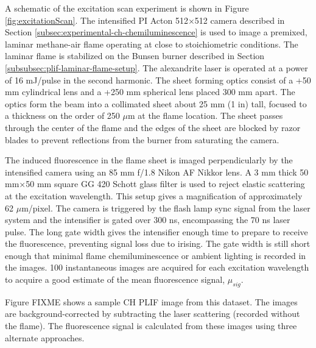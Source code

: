 A schematic of the excitation scan experiment is shown in Figure \ref{fig:excitationScan}.
The intensified PI Acton 512\(\times\)512 camera described in Section \ref{subsec:experimental-ch-chemiluminescence} is used to image a premixed, laminar methane-air flame operating at close to stoichiometric conditions.
The laminar flame is stabilized on the Bunsen burner described in Section \ref{subsubsec:plif-laminar-flame-setup}.
The alexandrite laser is operated at a power of 16 mJ/pulse in the second harmonic.
The sheet forming optics consist of a +50 mm cylindrical lens and a +250 mm spherical lens placed 300 mm apart.
The optics form the beam into a collimated sheet about 25 mm (1 in) tall, focused to a thickness on the order of 250 \(\mu\)m at the flame location.
The sheet passes through the center of the flame and the edges of the sheet are blocked by razor blades to prevent reflections from the burner from saturating the camera.

The induced fluorescence in the flame sheet is imaged perpendicularly by the intensified camera using an 85 mm f/1.8 Nikon AF Nikkor lens.
A 3 mm thick 50 mm\(\times\)50 mm square GG 420 Schott glass filter is used to reject elastic scattering at the excitation wavelength.
This setup gives a magnification of approximately 62 \(\mu\)m/pixel.
The camera is triggered by the flash lamp sync signal from the laser system and the intensifier is gated over 300 ns, encompassing the 70 ns laser pulse.
The long gate width gives the intensifier enough time to prepare to receive the fluorescence, preventing signal loss due to irising.
The gate width is still short enough that minimal flame chemiluminescence or ambient lighting is recorded in the images.
100 instantaneous images are acquired for each excitation wavelength to acquire a good estimate of the mean fluorescence signal, \(\mu_{sig}\).

Figure FIXME shows a sample CH PLIF image from this dataset.
The images are background-corrected by subtracting the laser scattering (recorded without the flame).
The fluorescence signal is calculated from these images using three alternate approaches.

